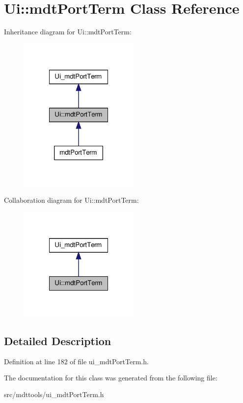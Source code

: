 \hypertarget{class_ui_1_1mdt_port_term}{
\section{Ui::mdtPortTerm Class Reference}
\label{class_ui_1_1mdt_port_term}
}


Inheritance diagram for Ui::mdtPortTerm:\nopagebreak
\begin{figure}[H]
\begin{center}
\leavevmode
\includegraphics[width=168pt]{class_ui_1_1mdt_port_term__inherit__graph}
\end{center}
\end{figure}


Collaboration diagram for Ui::mdtPortTerm:\nopagebreak
\begin{figure}[H]
\begin{center}
\leavevmode
\includegraphics[width=168pt]{class_ui_1_1mdt_port_term__coll__graph}
\end{center}
\end{figure}


\subsection{Detailed Description}


Definition at line 182 of file ui\_\-mdtPortTerm.h.



The documentation for this class was generated from the following file:\begin{DoxyCompactItemize}
\item 
src/mdttools/ui\_\-mdtPortTerm.h\end{DoxyCompactItemize}
